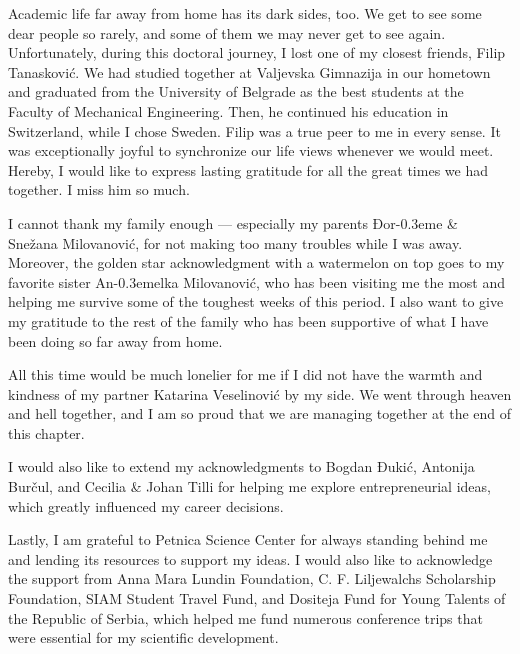 \documentclass{UUThesisTemplate}
\newcommand*\strike[1]{\bibnamefont{#1}\kern-0.3em{\raisebox{0.75ex}{-}}}
\begin{document}
{\par
Academic life far away from home has its dark sides, too. We get to see some dear people so rarely, and some of them we may never get to see again. Unfortunately, during this doctoral journey, I lost one of my closest friends, Filip Tanasković. We had studied together at Valjevska Gimnazija in our hometown and graduated from the University of Belgrade as the best students at the Faculty of Mechanical Engineering. Then, he continued his education in Switzerland, while I chose Sweden. Filip was a true peer to me in every sense. It was exceptionally joyful to synchronize our life views whenever we would meet. Hereby, I would like to express lasting gratitude for all the great times we had together. I miss him so much.

\par
I cannot thank my family enough --- especially my parents Đor\strike{d}e \& Snežana Milovanović, for not making too many troubles while I was away. Moreover, the golden star acknowledgment with a watermelon on top goes to my favorite sister An\strike{d}elka Milovanović, who has been visiting me the most and helping me survive some of the toughest weeks of this period. I also want to give my gratitude to the rest of the family who has been supportive of what I have been doing so far away from home. 

\par
All this time would be much lonelier for me if I did not have the warmth and kindness of my partner Katarina Veselinović by my side. We went through heaven and hell together, and I am so proud that we are managing together at the end of this chapter.

\par
I would also like to extend my acknowledgments to Bogdan Đukić, Antonija Burčul, and Cecilia \& Johan Tilli for helping me explore entrepreneurial ideas, which greatly influenced my career decisions.

\par
Lastly, I am grateful to Petnica Science Center for always standing behind me and lending its resources to support my ideas. I would also like to acknowledge the support from Anna Mara Lundin Foundation, C. F. Liljewalchs Scholarship Foundation, SIAM Student Travel Fund, and Dositeja Fund for Young Talents of the Republic of Serbia, which helped me fund numerous conference trips that were essential for my scientific development.
}
\end{document}
